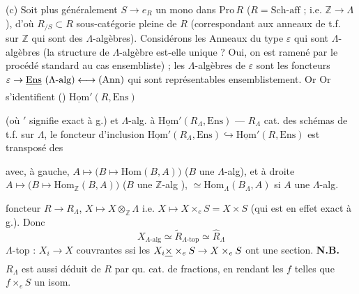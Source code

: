 \documentclass[11pt,a4paper]{article}
\begin{document}
\begin{enumerate}
    (c) Soit plus généralement $S \to e_{R}$ un mono dans $\mathrm{Pro}\,R$
    ($R = \mathrm{Sch}\text{-}\mathrm{aff}$ ; i.e. $\mathbb{Z} \to \Lambda$
    ), d'où $R_{/S} \subset R$ sous-catégorie pleine de
    $R$ (correspondant aux anneaux de t.f. sur $\mathbb{Z}$ qui sont des
    $\Lambda$-algèbres). Considérons les Anneaux du type $\varepsilon$ qui
    sont $\Lambda$-algèbres (la structure de $\Lambda$-algèbre est-elle
    unique ? Oui, on est ramené par le procédé standard au cas ensembliste) ;
    les $\Lambda$-algèbres de $\varepsilon$ sont les foncteurs \ill{}
    $\varepsilon \to \struck{\mathrm{Ens}}\ (\Lambda\text{-alg})
    \longleftrightarrow (\mathrm{Ann})$ qui sont représentables
    ensemblistement. Or \struck{\ill{}}  Or s'identifient () 
    $\underline{\mathrm{Hom}}'(R, \mathrm{Ens})$
\end{enumerate}

(où $'$ signifie exact à g.) et $\Lambda$-alg. à
$\underline{\mathrm{Hom}}'(R_{\Lambda}, \mathrm{Ens})$ — $R_{\Lambda}$ cat.
des schémas de t.f. sur $\Lambda$, le foncteur d'inclusion
$\underline{\mathrm{Hom}}'(R_{\Lambda}, \mathrm{Ens}) \hookrightarrow
\underline{\mathrm{Hom}}'(R, \mathrm{Ens})$ est transposé des


avec, à gauche, $A \mapsto \bigl(B \mapsto \mathrm{Hom}(B, A)\bigr)$
($B$ une $\Lambda$-alg), et à droite $A \mapsto \bigl(B \mapsto
\mathrm{Hom}_{\mathbb{Z}}(B, A)\bigr)$ ($B$ une $\mathbb{Z}$-alg
), $\simeq \mathrm{Hom}_{\Lambda}(B_{\Lambda}, A)$ si
$A$ une $\Lambda$-alg.

foncteur $R \to R_{\Lambda}$, $X \mapsto X \otimes_{\mathbb{Z}} \Lambda$
i.e. $X \mapsto X \times_{e} S = X \times S$ (qui est en effet exact à g.).
Donc
\[
  X_{\Lambda\text{-alg}} \simeq \tilde{R}_{\Lambda\text{-top}}
  \simeq \hat{R}_{\Lambda}
\]
$\Lambda$-top : $X_{i} \to X$ couvrantes ssi les $X_{i} \struck{\times} \times_{e}
S \to X \times_{e} S$ ont une section. \textbf{N.B.}\ $R_{\Lambda}$ est aussi
déduit de $R$ par qu. cat. de fractions, en rendant les $f$ telles que
$f \times_{e} S$ un isom.
\end{document}

